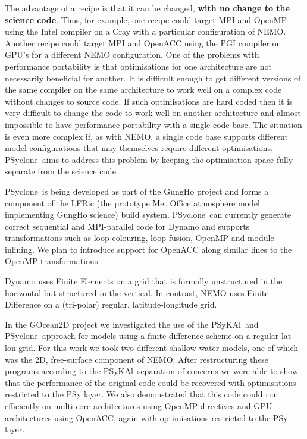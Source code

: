 \documentclass{article}
\newcommand{\psykal}{{PS}y{KA}l}
\newcommand{\psyclone}{{PS}yclone}
\begin{document}
The advantage of a recipe is that it can be changed, {\bf with no
  change to the science code}. Thus, for example, one recipe could
target MPI and OpenMP using the Intel compiler on a Cray with a
particular configuration of NEMO. Another recipe could target MPI and
OpenACC using the PGI compiler on GPU's for a different NEMO
configuration. One of the problems with performance portability is
that optimisations for one architecture are not necessarily beneficial
for another. It is difficult enough to get different versions of the
same compiler on the same architecture to work well on a complex code
without changes to source code. If such optimisations are hard coded
then it is very difficult to change the code to work well on another
architecture and almost impossible to have performance portability
with a single code base. The situation is even more complex if, as
with NEMO, a single code base supports different model configurations
that may themselves require different optimisations. \psyclone\ aims
to address this problem by keeping the optimisation space fully
separate from the science code.

\psyclone\ is being developed as part of the GungHo project
and forms a component of the LFRic (the prototype Met Office
atmosphere model implementing GungHo science) build
system. \psyclone\ can currently generate correct sequential and
MPI-parallel code for Dynamo and supports transformations such as loop
colouring, loop fusion, OpenMP and module inlining. We plan to
introduce support for OpenACC along similar lines to the OpenMP
transformations.

Dynamo uses Finite Elements on a grid that is formally
unstructured in the horizontal but structured in the vertical.  In
contrast, NEMO uses Finite Difference on a (tri-polar) regular,
latitude-longitude grid.

In the GOcean2D project we investigated the use of the \psykal\ and
\psyclone\ approach for models using a finite-difference scheme on a
regular lat-lon grid. For this work we took two different
shallow-water models, one of which was the 2D, free-surface component
of NEMO. After restructuring these programs according to the
\psykal\ separation of concerns we were able to show that the
performance of the original code could be recovered with optimisations
restricted to the PSy layer. We also demonstrated that this code could
run efficiently on multi-core architectures using OpenMP directives
and GPU architectures using OpenACC, again with optimisations
restricted to the PSy layer.
\end{document}
